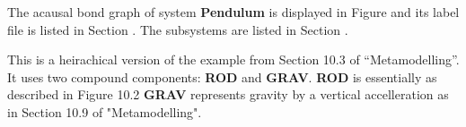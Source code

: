 

   The acausal bond graph of system \textbf{Pendulum} is
   displayed in Figure  and its label
   file is listed in Section .
   The subsystems are listed in Section .

This is a heirachical version of the example from Section 10.3 of
``Metamodelling''.  It uses two compound components: {\bf ROD} and {\bf
GRAV}. {\bf ROD} is
essentially as described in Figure 10.2 {\bf GRAV} represents gravity by a
vertical accelleration as in Section 10.9 of "Metamodelling".

